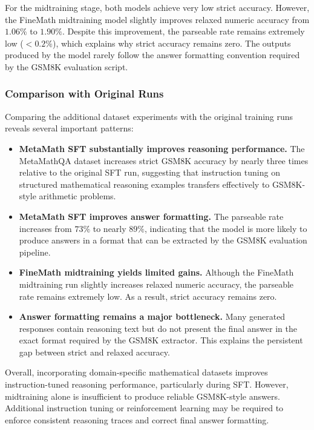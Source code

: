 For the midtraining stage, both models achieve very low strict accuracy.
However, the FineMath midtraining model slightly improves relaxed
numeric accuracy from $1.06\%$ to $1.90\%$. Despite this improvement,
the parseable rate remains extremely low ($<0.2\%$), which explains
why strict accuracy remains zero. The outputs produced by the model
rarely follow the answer formatting convention required by the
GSM8K evaluation script.

\subsubsection{Comparison with Original Runs}

Comparing the additional dataset experiments with the original training
runs reveals several important patterns:

\begin{itemize}

\item \textbf{MetaMath SFT substantially improves reasoning performance.}
The MetaMathQA dataset increases strict GSM8K accuracy by nearly
three times relative to the original SFT run, suggesting that
instruction tuning on structured mathematical reasoning examples
transfers effectively to GSM8K-style arithmetic problems.

\item \textbf{MetaMath SFT improves answer formatting.}
The parseable rate increases from $73\%$ to nearly $89\%$, indicating
that the model is more likely to produce answers in a format that can
be extracted by the GSM8K evaluation pipeline.

\item \textbf{FineMath midtraining yields limited gains.}
Although the FineMath midtraining run slightly increases relaxed
numeric accuracy, the parseable rate remains extremely low. As a
result, strict accuracy remains zero.

\item \textbf{Answer formatting remains a major bottleneck.}
Many generated responses contain reasoning text but do not present the
final answer in the exact format required by the GSM8K extractor.
This explains the persistent gap between strict and relaxed accuracy.

\end{itemize}

Overall, incorporating domain-specific mathematical datasets improves
instruction-tuned reasoning performance, particularly during SFT.
However, midtraining alone is insufficient to produce reliable
GSM8K-style answers. Additional instruction tuning or reinforcement
learning may be required to enforce consistent reasoning traces and
correct final answer formatting.

